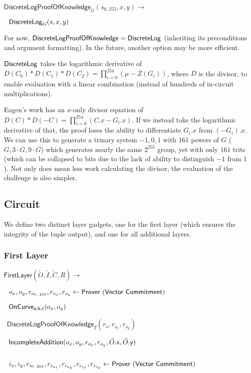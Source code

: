\documentclass[]{article}
\begin{document}
\newcommand{\dlogpok}{\mathsf{DiscreteLogProofOfKnowledge}}

$\dlogpok_G(s_{0..255}, x, y) \rightarrow$

$~~\mathsf{DiscreteLog}_G(s, x, y)$

For now, $\dlogpok = \dlog$ (inheriting its preconditions and argument formatting). In the future, another option may be more efficient.

$\mathsf{DiscreteLog}$ takes the logarithmic derivative of $D(C_0) * D(C_1) * D(C_2) = \prod_{i=0}^{254}(\mu - Z(G_i))$, where $D$ is the divisor, to enable evaluation with a linear combination (instead of hundreds of in-circuit multiplications).

Eagen's work has an $x$-only divisor equation of $D(C) * D(-C) = \prod_{i=0}^{254}(C.x - G_i.x)$. If we instead take the logarithmic derivative of that, the proof loses the ability to differentiate $G_i.x$ from $(-G_i).x$. We can use this to generate a trinary system $-1, 0, 1$ with $161$ powers of $G$ ($G, 3 \cdot G, 9 \cdot G$) which generates nearly the same $2^{255}$ group, yet with only $161$ trits (which can be collapsed to bits due to the lack of ability to distinguish $-1$ from $1$). Not only does mean less work calculating the divisor, the evaluation of the challenge is also simpler.

\newpage

\subsection{Circuit}

We define two distinct layer gadgets, one for the first layer (which ensures the integrity of the tuple output), and one for all additional layers.

\subsubsection{First Layer}

$\mathsf{FirstLayer}(\tilde{O}, \tilde{I}, \tilde{C}, R) \rightarrow$

$~~o_x, o_y, r_{o_{0..255}}, r_{o_x}, r_{o_y}\leftarrow \mathsf{Prover ~(Vector ~Commitment)}$

$~~\mathsf{OnCurve_{a,b,c}}(o_x, o_y)$

$~~\dlogpok_T(r_o, r_{o_x}, r_{o_y})$

$~~\mathsf{IncompleteAddition}(o_x, o_y, r_{o_x}, r_{o_y}, \tilde{O}\mathsf{.x}, \tilde{O}\mathsf{.y})$

$ $

$~~i_x, i_y, r_{i_{0..255}}, r_{i_{u_x}}, r_{i_{u_y}}, r_{i_{v_x}}, r_{i_{v_y}}\leftarrow \mathsf{Prover ~(Vector ~Commitment)}$
\end{document}
